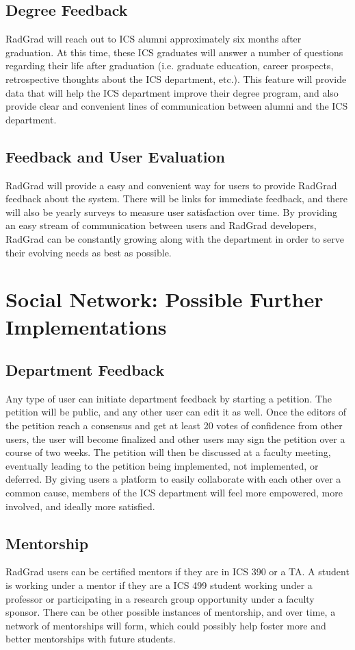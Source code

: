 \subsection{Degree Feedback}
RadGrad will reach out to ICS alumni approximately six months after graduation. At this time, these ICS graduates will answer a number of questions regarding their life after graduation (i.e. graduate education, career prospects, retrospective thoughts about the ICS department, etc.). This feature will provide data that will help the ICS department improve their degree program, and also provide clear and convenient lines of communication between alumni and the ICS department. 
\subsection{Feedback and User Evaluation}
RadGrad will provide a easy and convenient way for users to provide RadGrad feedback about the system. There will be links for immediate feedback, and there will also be yearly surveys to measure user satisfaction over time. By providing an easy stream of communication between users and RadGrad developers, RadGrad can be constantly growing along with the department in order to serve their evolving needs as best as possible.

\section{Social Network: Possible Further Implementations}
\subsection{Department Feedback}
Any type of user can initiate department feedback by starting a petition. The petition will be public, and any other user can edit it as well. Once the editors of the petition reach a consensus and get at least 20 votes of confidence from other users, the user will become finalized and other users may sign the petition over a course of two weeks. The petition will then be discussed at a faculty meeting, eventually leading to the petition being implemented, not implemented, or deferred. By giving users a platform to easily collaborate with each other over a common cause, members of the ICS department will feel more empowered, more involved, and ideally more satisfied.

\subsection{Mentorship}
RadGrad users can be certified mentors if they are in ICS 390 or a TA. A student is working under a mentor if they are a ICS 499 student working under a professor or participating in a research group opportunity under a faculty sponsor. There can be other possible instances of mentorship, and over time, a network of mentorships will form, which could possibly help foster more and better mentorships with future students.

